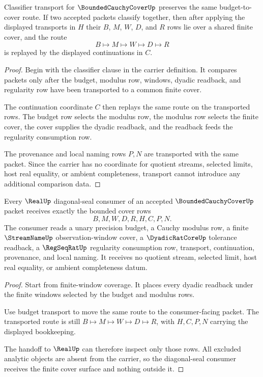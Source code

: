 \begin{theorem}
\label{thm:bounded-cauchy-cover-budget-transport}
Classifier transport for $\BoundedCauchyCoverUp$ preserves the same budget-to-cover route. If two accepted packets classify together, then after applying the displayed transports in $H$ their $B$, $M$, $W$, $D$, and $R$ rows lie over a shared finite cover, and the route
$$
B \longmapsto M \longmapsto W \longmapsto D \longmapsto R
$$
is replayed by the displayed continuations in $C$.
\end{theorem}
\begin{proof}
Begin with the classifier clause in the carrier definition. It compares packets only after the budget, modulus row, windows, dyadic readback, and regularity row have been transported to a common finite cover.

The continuation coordinate $C$ then replays the same route on the transported rows. The budget row selects the modulus row, the modulus row selects the finite cover, the cover supplies the dyadic readback, and the readback feeds the regularity consumption row.

The provenance and local naming rows $P,N$ are transported with the same packet. Since the carrier has no coordinate for quotient streams, selected limits, host real equality, or ambient completeness, transport cannot introduce any additional comparison data.
\end{proof}

\begin{theorem}
\label{thm:bounded-cauchy-cover-real-handoff}
Every $\RealUp$ diagonal-seal consumer of an accepted $\BoundedCauchyCoverUp$ packet receives exactly the bounded cover rows
$$
B,M,W,D,R,H,C,P,N.
$$
The consumer reads a unary precision budget, a Cauchy modulus row, a finite $\StreamNameUp$ observation-window cover, a $\DyadicRatCoreUp$ tolerance readback, a $\RegSeqRatUp$ regularity consumption row, transport, continuation, provenance, and local naming. It receives no quotient stream, selected limit, host real equality, or ambient completeness datum.
\end{theorem}
\begin{proof}
Start from finite-window coverage. It places every dyadic readback under the finite windows selected by the budget and modulus rows.

Use budget transport to move the same route to the consumer-facing packet. The transported route is still $B \longmapsto M \longmapsto W \longmapsto D \longmapsto R$, with $H,C,P,N$ carrying the displayed bookkeeping.

The handoff to $\RealUp$ can therefore inspect only those rows. All excluded analytic objects are absent from the carrier, so the diagonal-seal consumer receives the finite cover surface and nothing outside it.
\end{proof}

